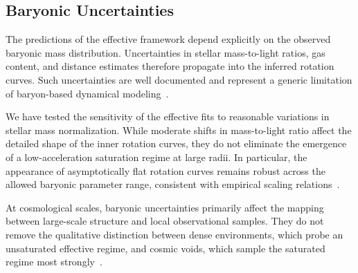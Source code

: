 \subsection{Baryonic Uncertainties}
  \label{subsec:baryonic_uncertainties}

  The predictions of the effective framework depend explicitly on the observed baryonic mass distribution.
  Uncertainties in stellar mass-to-light ratios, gas content, and distance
  estimates therefore propagate into the inferred rotation curves.
  Such uncertainties are well documented
  and represent a generic limitation of baryon-based dynamical modeling~\cite{Lelli2016SPARC}.

  We have tested the sensitivity of the effective fits to reasonable variations in stellar mass normalization.
  While moderate shifts in mass-to-light ratio affect the detailed shape of the
  inner rotation curves, they do not eliminate the emergence of a low-acceleration
  saturation regime at large radii.
  In particular, the appearance of asymptotically flat rotation curves
  remains robust across the allowed baryonic parameter range, consistent with
  empirical scaling relations~\cite{McGaugh2016}.

  At cosmological scales, baryonic uncertainties primarily affect the mapping
  between large-scale structure and local observational samples.
  They do not remove the qualitative distinction between dense environments,
  which probe an unsaturated effective regime, and cosmic voids, which sample the
  saturated regime most strongly~\cite{Keenan2013KBC}.
